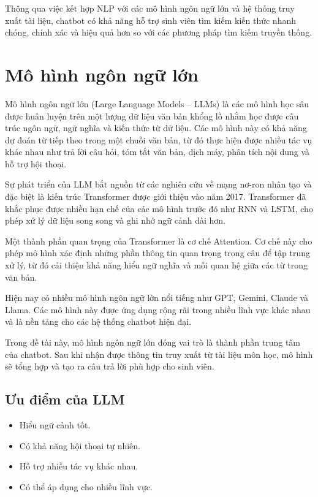 \documentclass[12pt,a4paper]{report}
\begin{document}
	Thông qua việc kết hợp NLP với các mô hình ngôn ngữ lớn và hệ thống truy xuất tài liệu, chatbot có khả năng hỗ trợ sinh viên tìm kiếm kiến thức nhanh chóng, chính xác và hiệu quả hơn so với các phương pháp tìm kiếm truyền thống.
	
	\section{Mô hình ngôn ngữ lớn}
	
	Mô hình ngôn ngữ lớn (Large Language Models -- LLMs) là các mô hình học sâu được huấn luyện trên một lượng dữ liệu văn bản khổng lồ nhằm học được cấu trúc ngôn ngữ, ngữ nghĩa và kiến thức từ dữ liệu. Các mô hình này có khả năng dự đoán từ tiếp theo trong một chuỗi văn bản, từ đó thực hiện được nhiều tác vụ khác nhau như trả lời câu hỏi, tóm tắt văn bản, dịch máy, phân tích nội dung và hỗ trợ hội thoại.
	
	Sự phát triển của LLM bắt nguồn từ các nghiên cứu về mạng nơ-ron nhân tạo và đặc biệt là kiến trúc Transformer được giới thiệu vào năm 2017. Transformer đã khắc phục được nhiều hạn chế của các mô hình trước đó như RNN và LSTM, cho phép xử lý dữ liệu song song và ghi nhớ ngữ cảnh dài hơn.
	
	Một thành phần quan trọng của Transformer là cơ chế Attention. Cơ chế này cho phép mô hình xác định những phần thông tin quan trọng trong câu để tập trung xử lý, từ đó cải thiện khả năng hiểu ngữ nghĩa và mối quan hệ giữa các từ trong văn bản.
	
	Hiện nay có nhiều mô hình ngôn ngữ lớn nổi tiếng như GPT, Gemini, Claude và Llama. Các mô hình này được ứng dụng rộng rãi trong nhiều lĩnh vực khác nhau và là nền tảng cho các hệ thống chatbot hiện đại.
	
	Trong đề tài này, mô hình ngôn ngữ lớn đóng vai trò là thành phần trung tâm của chatbot. Sau khi nhận được thông tin truy xuất từ tài liệu môn học, mô hình sẽ tổng hợp và tạo ra câu trả lời phù hợp cho sinh viên.
	
	\subsection{Ưu điểm của LLM}
	
	\begin{itemize}
		\item Hiểu ngữ cảnh tốt.
		\item Có khả năng hội thoại tự nhiên.
		\item Hỗ trợ nhiều tác vụ khác nhau.
		\item Có thể áp dụng cho nhiều lĩnh vực.
	\end{itemize}
	
\end{document}

